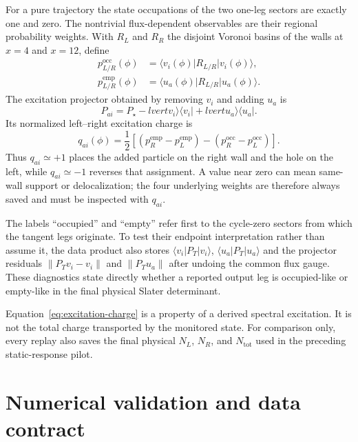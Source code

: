 \documentclass[aps,prb,twocolumn,floatfix,nofootinbib,superscriptaddress]{revtex4-2}
\begin{document}
For a pure trajectory the state occupations of the two one-leg sectors are
exactly one and zero.  The nontrivial flux-dependent observables are their
regional probability weights.  With $R_L$ and $R_R$ the disjoint Voronoi
basins of the walls at $x=4$ and $x=12$, define
\begin{align}
 p_{L/R}^{\mathrm{occ}}(\phi)
 &=\langle v_i(\phi)\rvert R_{L/R}\lvert v_i(\phi)\rangle,\\
 p_{L/R}^{\mathrm{emp}}(\phi)
 &=\langle u_a(\phi)\rvert R_{L/R}\lvert u_a(\phi)\rangle.
\end{align}
The excitation projector obtained by removing $v_i$ and adding $u_a$ is
\begin{equation}
 P_{ai}=P_\star-lvert v_i\rangle\langle v_i\rvert
                   +lvert u_a\rangle\langle u_a\rvert.
\end{equation}
Its normalized left--right excitation charge is
\begin{equation}
 q_{ai}(\phi)=\frac12\left[
 (p_R^{\mathrm{emp}}-p_L^{\mathrm{emp}})
 -(p_R^{\mathrm{occ}}-p_L^{\mathrm{occ}})
 \right].
 \label{eq:excitation-charge}
\end{equation}
Thus $q_{ai}\simeq+1$ places the added particle on the right wall and the hole
on the left, while $q_{ai}\simeq-1$ reverses that assignment.  A value near
zero can mean same-wall support or delocalization; the four underlying weights
are therefore always saved and must be inspected with $q_{ai}$.

The labels ``occupied'' and ``empty'' refer first to the cycle-zero sectors
from which the tangent legs originate.  To test their endpoint interpretation
rather than assume it, the data product also stores
$\langle v_i|P_T|v_i\rangle$, $\langle u_a|P_T|u_a\rangle$ and the projector
residuals $\|P_Tv_i-v_i\|$ and $\|P_Tu_a\|$ after undoing the common flux
gauge.  These diagnostics state directly whether a reported output leg is
occupied-like or empty-like in the final physical Slater determinant.

Equation~\eqref{eq:excitation-charge} is a property of a derived spectral
excitation.  It is not the total charge transported by the monitored state.
For comparison only, every replay also saves the final physical
$N_L$, $N_R$, and $N_{\mathrm{tot}}$ used in the preceding static-response
pilot.

\section{Numerical validation and data contract}
\end{document}
